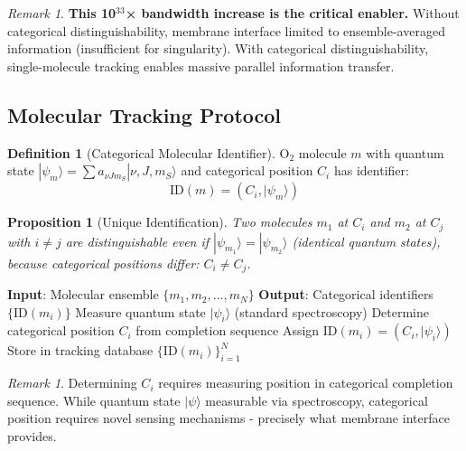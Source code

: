 \documentclass[11pt,a4paper]{article}
\newtheorem{proposition}[theorem]{Proposition}
\theoremstyle{definition}
\newtheorem{definition}[theorem]{Definition}
\theoremstyle{remark}
\newtheorem{remark}[theorem]{Remark}
\begin{document}
\begin{remark}
\textbf{This 10$^{33}$× bandwidth increase is the critical enabler.} Without categorical distinguishability, membrane interface limited to ensemble-averaged information (insufficient for singularity). With categorical distinguishability, single-molecule tracking enables massive parallel information transfer.
\end{remark}

\subsection{Molecular Tracking Protocol}

\begin{definition}[Categorical Molecular Identifier]
O$_2$ molecule $m$ with quantum state $|\psi_m\rangle = \sum a_{\nu Jm_S} |\nu, J, m_S\rangle$ and categorical position $C_i$ has identifier:
\begin{equation}
\text{ID}(m) = (C_i, |\psi_m\rangle)
\end{equation}
\end{definition}

\begin{proposition}[Unique Identification]
Two molecules $m_1$ at $C_i$ and $m_2$ at $C_j$ with $i \neq j$ are distinguishable even if $|\psi_{m_1}\rangle = |\psi_{m_2}\rangle$ (identical quantum states), because categorical positions differ: $C_i \neq C_j$.
\end{proposition}

\begin{algorithm}[H]
\caption{Categorical Molecular Tracking}
\begin{algorithmic}[1]
\STATE \textbf{Input}: Molecular ensemble $\{m_1, m_2, ..., m_N\}$
\STATE \textbf{Output}: Categorical identifiers $\{\text{ID}(m_i)\}$
    \STATE Measure quantum state $|\psi_i\rangle$ (standard spectroscopy)
    \STATE Determine categorical position $C_i$ from completion sequence
    \STATE Assign $\text{ID}(m_i) = (C_i, |\psi_i\rangle)$
    \STATE Store in tracking database
\ENDFOR
\RETURN $\{\text{ID}(m_i)\}_{i=1}^N$
\end{algorithmic}
\end{algorithm}

\begin{remark}
Determining $C_i$ requires measuring position in categorical completion sequence. While quantum state $|\psi\rangle$ measurable via spectroscopy, categorical position requires novel sensing mechanisms - precisely what membrane interface provides.
\end{remark}
\end{document}
